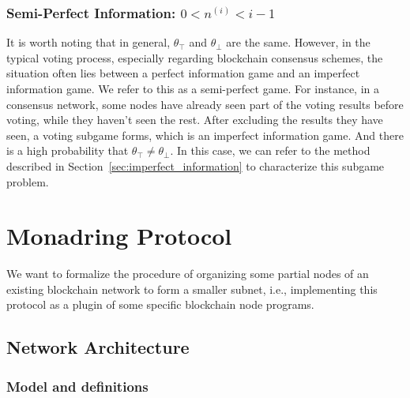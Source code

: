 \documentclass[11pt]{article}
\begin{document}
  \subsubsection{Semi-Perfect Information: $0<n^{(i)}<i-1$}
  It is worth noting that in general, $\theta_\top$ and $\theta_\bot$ are the same. However, in the typical voting process, especially regarding blockchain consensus schemes, the situation often lies between a perfect information game and an imperfect information game. We refer to this as a semi-perfect game. For instance, in a consensus network, some nodes have already seen part of the voting results before voting, while they haven't seen the rest. After excluding the results they have seen, a voting subgame forms, which is an imperfect information game. And there is a high probability that $\theta_\top \neq \theta_\bot$. In this case, we can refer to the method described in Section~\ref{sec:imperfect_information} to characterize this subgame problem.



\section{Monadring Protocol}
\label{sec:protocol}
We want to formalize the procedure of organizing some partial nodes of an existing blockchain network to form a smaller subnet, i.e., implementing this protocol as a plugin of some specific blockchain node programs.
\subsection{Network Architecture}
\subsubsection{Model and definitions}
\end{document}

